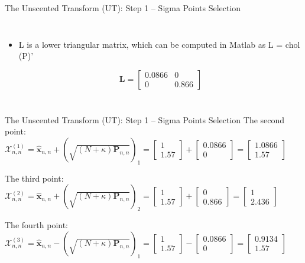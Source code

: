 \begin{frame}{The Unscented Transform (UT): Step 1 – Sigma Points Selection}
\begin{columns}
\begin{itemize}
    \item L is a lower triangular matrix, which can be computed in Matlab as L = chol (P)’

    \[
    \mathbf{L} =
    \begin{bmatrix}
    0.0866 & 0 \\
    0 & 0.866
    \end{bmatrix}
    \]
\end{itemize}
\end{columns}
\end{frame}

\begin{frame}{The Unscented Transform (UT): Step 1 – Sigma Points Selection}
The second point: \(\mathcal{X}^{(1)}_{n,n} = \hat{\mathbf{x}}_{n,n} + \left(\sqrt{(N + \kappa)\mathbf{P}_{n,n}}\right)_1 = 
\begin{bmatrix}
1 \\
1.57
\end{bmatrix}
+
\begin{bmatrix}
0.0866 \\
0
\end{bmatrix}
=
\begin{bmatrix}
1.0866 \\
1.57
\end{bmatrix}
\)

The third point: \(\mathcal{X}^{(2)}_{n,n} = \hat{\mathbf{x}}_{n,n} + \left(\sqrt{(N + \kappa)\mathbf{P}_{n,n}}\right)_2 = 
\begin{bmatrix}
1 \\
1.57
\end{bmatrix}
+
\begin{bmatrix}
0 \\
0.866
\end{bmatrix}
=
\begin{bmatrix}
1 \\
2.436
\end{bmatrix}
\)

The fourth point: \(\mathcal{X}^{(3)}_{n,n} = \hat{\mathbf{x}}_{n,n} - \left(\sqrt{(N + \kappa)\mathbf{P}_{n,n}}\right)_1 = 
\begin{bmatrix}
1 \\
1.57
\end{bmatrix}
-
\begin{bmatrix}
0.0866 \\
0
\end{bmatrix}
=
\begin{bmatrix}
0.9134 \\
1.57
\end{bmatrix}
\)


\end{frame}
